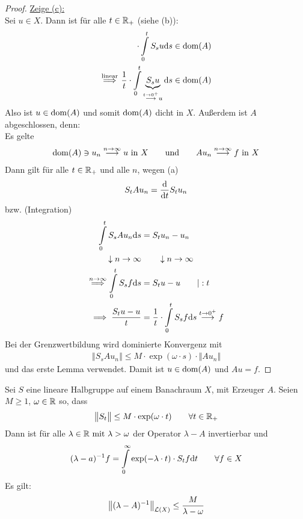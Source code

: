 \begin{proof}
	\underline{Zeige (c):}\\
	Sei $u\in X$. 
	Dann ist für alle $t\in\mathbb{R}_+$ (siehe (b)):
	\begin{align*}
		\cdot\int\limits_0^t S_s u \mathrm{d} s\in\operatorname{dom}(A)\\
		\overset{\text{linear}}{\implies}
		\frac{1}{t}\cdot\int\limits_0^t \underbrace{S_s u}_{\stackrel{t\to 0^+}{\longrightarrow} u} \mathrm{d} s\in\operatorname{dom}(A)\\
	\end{align*}
	Also ist $u\in\operatorname{dom}(A)$ und somit $\operatorname{dom}(A)$ dicht in $X$. 
	Außerdem ist $A$ abgeschlossen, denn:\\
	Es gelte
	\begin{align*}
		\operatorname{dom}(A)\ni u_n\stackrel{n\to\infty}{\longrightarrow} u\text{ in }X
		\qquad\text{und}\qquad
		A u_n\stackrel{n\to\infty}{\longrightarrow} f\text{ in }X
	\end{align*}
	Dann gilt für alle $t\in\mathbb{R}_+$ und alle $n$, wegen (a)
	\begin{align*}
		S_t A u_n=\frac{\mathrm{d}}{\mathrm{d} t}S_t u_n
	\end{align*}
	bzw. (Integration)
	\begin{align*}
		\int\limits_0^t S_s A u_n\mathrm{d} s&=S_t u_n-u_n\\
		\downarrow n\to\infty&\qquad\downarrow n\to\infty\\
		\overset{n\to\infty}{\implies}
		\int\limits_0^t S_s f\mathrm{d} s&=S_t u-u\qquad|:t\\
		\implies
		\frac{S_t u-u}{t}&=\frac{1}{t}\cdot\int\limits_0^t S_s f\mathrm{d} s\stackrel{t\to0^+}{\longrightarrow} f
	\end{align*}
	Bei der Grenzwertbildung wird dominierte Konvergenz mit
	\begin{align*}
		\left\Vert S_s A u_n\right\Vert\leq M\cdot\exp(\omega\cdot s)\cdot\big\Vert A u_n\big\Vert
	\end{align*}
	und das erste Lemma verwendet.
	Damit ist $u\in\operatorname{dom}(A)$ und $Au=f$.
\end{proof}

\begin{lemma}
	Sei $S$ eine lineare Halbgruppe auf einem Banachraum $X$, mit Erzeuger $A$. 
	Seien $M\geq1$, $\omega\in\mathbb{R}$ so, dass 
	\begin{align*}
		\big\Vert S_t\big\Vert\leq M\cdot\exp(\omega\cdot t)\qquad\forall t\in\mathbb{R}_+
	\end{align*}
	Dann ist für alle $\lambda\in\mathbb{R}\text{ mit }\lambda>\omega$ der Operator $\lambda-A$ invertierbar und 
	\begin{align*}
		(\lambda-a)^{-1}f=\int\limits_0^\infty\exp(-\lambda\cdot t)\cdot S_t f\mathrm{d} t\qquad\forall f\in X
	\end{align*}
	Es gilt:
	\begin{align*}
		\left\Vert(\lambda-A)^{-1}\right\Vert_{\mathcal{L}(X)}\leq\frac{M}{\lambda-\omega}
	\end{align*}
\end{lemma}

